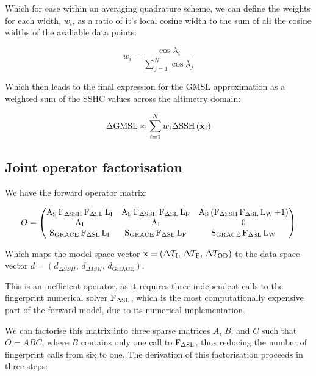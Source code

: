 Which for ease within an averaging quadrature scheme, we can define the weights for each width, $w_i$, as a ratio of it's local cosine width to the sum of all the cosine widths of the avaliable data points:

\begin{equation}
    w_i = \dfrac{\cos \lambda_i}{\sum^N_{j=1}\cos \lambda_j}
\end{equation}

Which then leads to the final expression for the GMSL approximation as a weighted sum of the SSHC values across the altimetry domain:

\begin{equation}
    \Delta \mathrm{GMSL} \approx \sum^N_{i=1} w_i \Delta \mathrm{SSH}\left(\mathbf{x}_i\right)
\end{equation}


\subsection{Joint operator factorisation}\label{sec:joint_operator_factorisation}

We have the forward operator matrix:

\begin{equation}
    O = \begin{pmatrix}
        \operatorname{{A}}_{{\mathrm{S}}} \operatorname{{F}}_{{\Delta \mathrm{SSH}}} \operatorname{{F}}_{{\Delta \mathrm{SL}}} \operatorname{{L}}_{{\text{I}}} & \operatorname{{A}}_{{\mathrm{S}}} \operatorname{{F}}_{{\Delta \mathrm{SSH}}} \operatorname{{F}}_{{\Delta \mathrm{SL}}} \operatorname{{L}}_{{\text{F}}} & \operatorname{{A}}_{{\mathrm{S}}}\left(\operatorname{{F}}_{{\Delta \mathrm{SSH}}} \operatorname{{F}}_{{\Delta \mathrm{SL}}} \operatorname{{L}}_{{\text{W}}} + 1\right) \\
        \operatorname{{A}}_{{\mathrm{I}}} & \operatorname{{A}}_{{\mathrm{I}}} & 0 \\
        \operatorname{{S}}_{{\mathrm{GRACE}}} \operatorname{{F}}_{{\Delta \mathrm{SL}}} \operatorname{{L}}_{{\text{I}}} & \operatorname{{S}}_{{\mathrm{GRACE}}} \operatorname{{F}}_{{\Delta \mathrm{SL}}} \operatorname{{L}}_{{\text{F}}} & \operatorname{{S}}_{{\mathrm{GRACE}}} \operatorname{{F}}_{{\Delta \mathrm{SL}}} \operatorname{{L}}_{{\text{W}}}
    \end{pmatrix}
\end{equation}

Which maps the model space vector $\mathbf{x} = \left(\Delta T_\text{I},\, \Delta T_\text{F},\, \Delta T_\text{OD}\right)$ to the data space vector $d = \left(d_{\Delta SSH},\, d_{\Delta ISH},\, d_{\text{GRACE}}\right)$.

This is an inefficient operator, as it requires three independent calls to the fingerprint numerical solver $\operatorname{{F}}_{{\Delta \mathrm{SL}}}$, which is the most computationally expensive part of the forward model, due to its numerical implementation.

We can factorise this matrix into three sparse matrices $A$, $B$, and $C$ such that $O = ABC$, where $B$ contains only one call to $\operatorname{{F}}_{{\Delta \mathrm{SL}}}$, thus reducing the number of fingerprint calls from six to one. The derivation of this factorisation proceeds in three steps:

